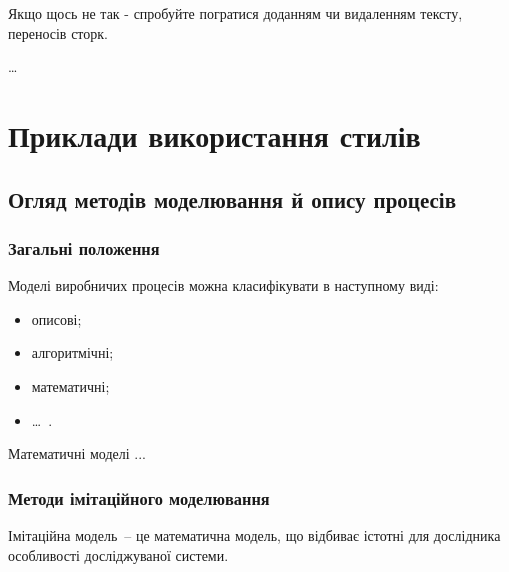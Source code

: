 Якщо щось не так - спробуйте погратися доданням чи видаленням тексту, переносів
сторк.

\begin{longEnumerate}
\item \ldots 
\end{longEnumerate}

\section{Приклади використання стилів}

\subsection{Огляд методів моделювання й опису процесів}
\subsubsection{Загальні положення}
Моделі виробничих процесів можна класифікувати в наступному виді:
\begin{itemize}
\item описові;
\item алгоритмічні;
\item математичні;
\item \dots~.
\end{itemize}

Математичні моделі ...

\subsubsection{Методи імітаційного моделювання}
Імітаційна модель~-- це математична модель, що відбиває істотні для дослідника особливості досліджуваної системи.

